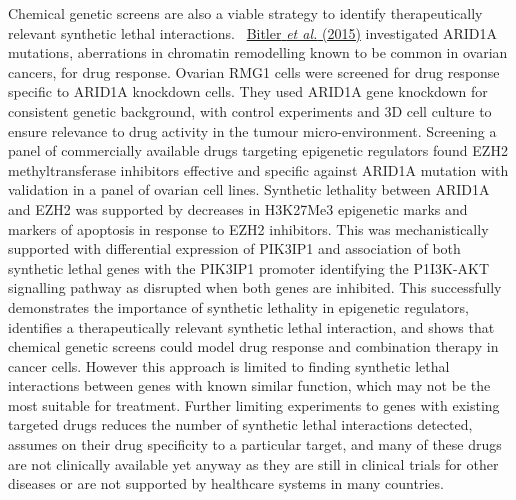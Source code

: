 Chemical genetic screens are also a viable strategy to identify
therapeutically relevant synthetic lethal interactions.
\ \hyperlink{ENREF13}{Bitler}\hyperlink{ENREF13}{\textit{ et
al.}}\hyperlink{ENREF13}{ (2015)} investigated ARID1A mutations,
aberrations in chromatin remodelling known to be common in ovarian
cancers, for drug response. Ovarian RMG1 cells were screened for drug
response specific to ARID1A knockdown cells. They used ARID1A gene
knockdown for consistent genetic background, with control experiments
and 3D cell culture to ensure relevance to drug activity in the tumour
micro-environment. Screening a panel of commercially available drugs
targeting epigenetic regulators found EZH2 methyltransferase inhibitors
effective and specific against ARID1A mutation with validation in a
panel of ovarian cell lines. Synthetic lethality between ARID1A and
EZH2 was supported by decreases in H3K27Me3 epigenetic marks and
markers of apoptosis in response to EZH2 inhibitors. This was
mechanistically supported with differential expression of PIK3IP1 and
association of both synthetic lethal genes with the PIK3IP1 promoter
identifying the P1I3K-AKT signalling pathway as disrupted when both
genes are inhibited. This successfully demonstrates the importance of
synthetic lethality in epigenetic regulators, identifies a
therapeutically relevant synthetic lethal interaction, and shows that
chemical genetic screens could model drug response and combination
therapy in cancer cells. However this approach is limited to finding
synthetic lethal interactions between genes with known similar
function, which may not be the most suitable for treatment. Further
limiting experiments to genes with existing targeted drugs reduces the
number of synthetic lethal interactions detected, assumes on their drug
specificity to a particular target, and many of these drugs are not
clinically available yet anyway as they are still in clinical trials
for other diseases or are not supported by healthcare systems in many
countries. 


